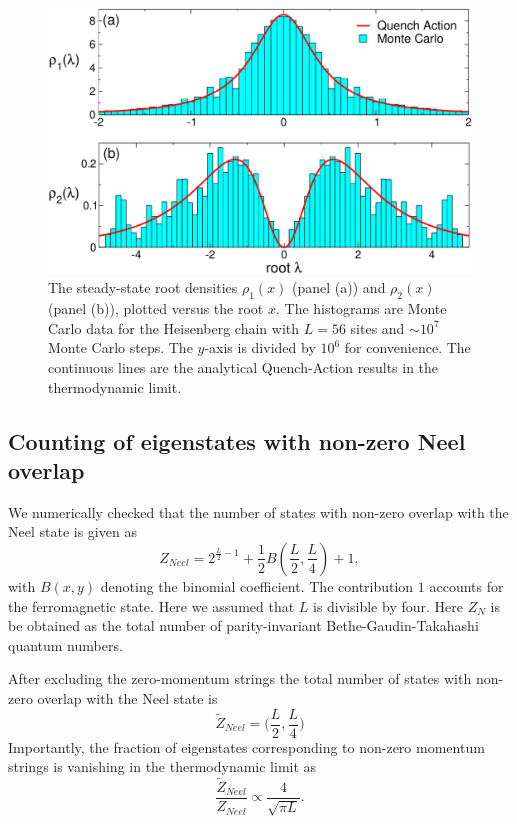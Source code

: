 \documentclass[11pt]{iopart}
\begin{document}
\begin{figure}[t]
\begin{center}
\includegraphics[width=.8\textwidth]{./draft_figs/Neel_rho}
\end{center}
\caption{ The steady-state root densities $\rho_1(x)$ (panel (a)) and 
 $\rho_2(x)$ (panel (b)), plotted versus the root $x$. The histograms 
 are Monte Carlo data for the Heisenberg chain with $L=56$ sites and 
 $\sim 10^7$ Monte Carlo steps. The $y$-axis is divided by $10^6$ for 
 convenience. The continuous lines are the analytical Quench-Action 
 results in the thermodynamic limit. 
}
\label{fig6-neel-roots}
\end{figure}



\subsection{Counting of eigenstates with non-zero Neel overlap}

We numerically checked that the number of states with non-zero overlap 
with the Neel state is given as 
%
\begin{equation}
\label{Neel-count}
Z_{Neel}=2^{\frac{L}{2}-1}+\frac{1}{2}B\left(\frac{L}{2},
\frac{L}{4}\right)+1,
\end{equation}
%
with $B(x,y)$ denoting the binomial coefficient. The contribution $1$ 
accounts for the ferromagnetic state. Here 
we assumed that $L$ is divisible by four. Here $Z_N$ is be obtained 
as the total number of parity-invariant Bethe-Gaudin-Takahashi quantum 
numbers. 

After excluding the zero-momentum strings the total number of states 
with non-zero overlap with the Neel state is 
%
\begin{equation}
\label{neel-ov-count}
\widetilde {Z}_{Neel}=\Big(\frac{L}{2},\frac{L}{4}\Big)
\end{equation}
%
Importantly, the fraction of eigenstates corresponding to non-zero momentum 
strings is vanishing in the thermodynamic limit as 
%
\begin{equation}
\frac{\widetilde Z_{Neel}}{Z_{Neel}}\propto\frac{4}{\sqrt{\pi L}}.
\end{equation}
%
\end{document}

